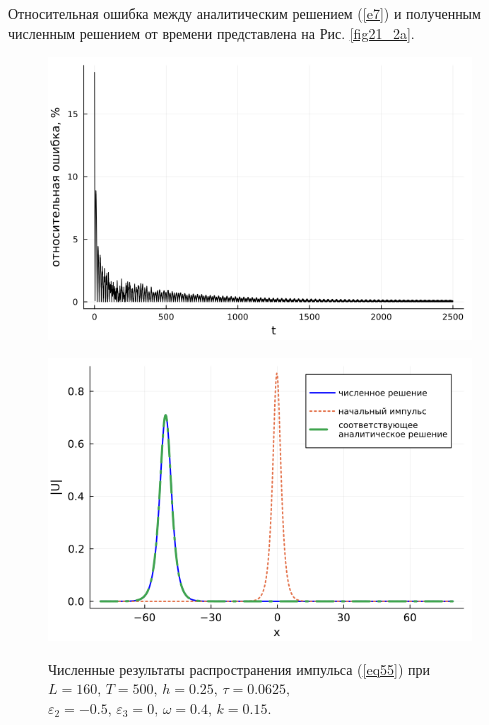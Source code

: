 \documentclass[12pt,a4paper]{article}
\begin{document}
	Относительная ошибка между аналитическим решением (\ref{e7}) и полученным численным решением от времени представлена на Рис. \ref{fig21_2a}.
	\begin{figure}[H]
		\begin{center}
			\begin{minipage}[h]{0.48\linewidth}
				\includegraphics[width=1\linewidth]{Medvedev_fig18.png}
				\label{fig21_2a}
			\end{minipage}
			\hfill
			\begin{minipage}[h]{0.48\linewidth}
				\includegraphics[width=1\linewidth]{Medvedev_fig19.png}
				\label{fig21_2b}
			\end{minipage}
		\end{center}
		\caption{Численные результаты распространения импульса (\ref{eq55}) при
		\(L=160,\, T=500,\, h=0.25,\, \tau=0.0625,\)
		\(\varepsilon_{2}=-0.5,\,\varepsilon_{3}=0,\, \omega=0.4,\, k=0.15\).}
		\label{fig21_2}
	\end{figure}
\end{document}
